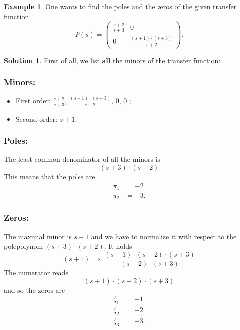 \documentclass[a4paper,12 pt]{article}
\numberwithin{equation}{section}
\theoremstyle{definition}
\newtheorem{bsp}{Example}
\theoremstyle{remark}
\theoremstyle{definition}
\newtheorem*{lsg}{Solution}
\theoremstyle{definition}
\theoremstyle{definition}
\theoremstyle{remark}
\begin{document}
\begin{bsp}
One wants to find the poles and the zeros of the given transfer function
\begin{equation*}
P(s)=\begin{pmatrix}
\frac{s+2}{s+3}&0\\ 0 & \frac{(s+1)\cdot (s+3)}{s+2}
\end{pmatrix}.
\end{equation*}
\newpage
\begin{lsg}
First of all, we list \textbf{all} the minors of the transfer function:
\subsubsection*{Minors:}
\begin{itemize}
\item First order: $\frac{s+2}{s+3}$, $\frac{(s+1)\cdot (s+3)}{s+2}
$, 0, 0 ;
\item Second order: $s+1$.
\end{itemize}
\subsubsection*{Poles:}
The least common denominator of all the minors is 
$$(s+3)\cdot (s+2)$$
This means that the poles are 
\begin{equation*}
\begin{split}
\pi_1&=-2\\
\pi_2&=-3.
\end{split}
\end{equation*}
\subsubsection*{Zeros:}
The maximal minor is $s+1$ and we have to normalize it with respect to the polepolynom $(s+3)\cdot (s+2)$. It holds
$$(s+1)\ \Rightarrow \ \frac{(s+1)\cdot (s+2)\cdot (s+3)}{(s+2)\cdot (s+3)}$$
The numerator reads
$$(s+1)\cdot (s+2)\cdot (s+3)$$
and so the zeros are
\begin{equation*}
\begin{split}
\zeta_1&=-1\\
\zeta_2&=-2\\
\zeta_3&=-3.\\
\end{split}
\end{equation*}
\end{lsg}
\end{bsp}
\newpage
\end{document}
